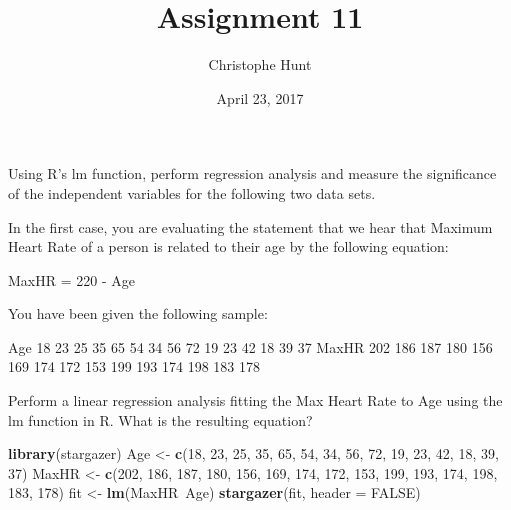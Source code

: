 \documentclass[]{article}
\title{Assignment 11}
\author{Christophe Hunt}
\date{April 23, 2017}
\newenvironment{Shaded}{\begin{snugshade}}{\end{snugshade}}
\newcommand{\KeywordTok}[1]{\textcolor[rgb]{0.13,0.29,0.53}{\textbf{{#1}}}}
\newcommand{\DataTypeTok}[1]{\textcolor[rgb]{0.13,0.29,0.53}{{#1}}}
\newcommand{\DecValTok}[1]{\textcolor[rgb]{0.00,0.00,0.81}{{#1}}}
\newcommand{\StringTok}[1]{\textcolor[rgb]{0.31,0.60,0.02}{{#1}}}
\newcommand{\OtherTok}[1]{\textcolor[rgb]{0.56,0.35,0.01}{{#1}}}
\newcommand{\NormalTok}[1]{{#1}}
\begin{document}
\maketitle

{
\setcounter{tocdepth}{2}
\tableofcontents
}
Using R's lm function, perform regression analysis and measure the
significance of the independent variables for the following two data
sets.

In the first case, you are evaluating the statement that we hear that
Maximum Heart Rate of a person is related to their age by the following
equation:

MaxHR = 220 - Age

You have been given the following sample:

Age 18 23 25 35 65 54 34 56 72 19 23 42 18 39 37 MaxHR 202 186 187 180
156 169 174 172 153 199 193 174 198 183 178

Perform a linear regression analysis fitting the Max Heart Rate to Age
using the lm function in R. What is the resulting equation?

\begin{Shaded}
\begin{Highlighting}[]
\KeywordTok{library}\NormalTok{(stargazer)}
\NormalTok{Age <-}\StringTok{ }\KeywordTok{c}\NormalTok{(}\DecValTok{18}\NormalTok{, }\DecValTok{23}\NormalTok{, }\DecValTok{25}\NormalTok{, }\DecValTok{35}\NormalTok{, }\DecValTok{65}\NormalTok{, }\DecValTok{54}\NormalTok{, }\DecValTok{34}\NormalTok{, }\DecValTok{56}\NormalTok{, }\DecValTok{72}\NormalTok{, }\DecValTok{19}\NormalTok{, }\DecValTok{23}\NormalTok{, }\DecValTok{42}\NormalTok{, }\DecValTok{18}\NormalTok{, }\DecValTok{39}\NormalTok{, }\DecValTok{37}\NormalTok{)}
\NormalTok{MaxHR <-}\StringTok{ }\KeywordTok{c}\NormalTok{(}\DecValTok{202}\NormalTok{, }\DecValTok{186}\NormalTok{, }\DecValTok{187}\NormalTok{, }\DecValTok{180}\NormalTok{, }\DecValTok{156}\NormalTok{, }\DecValTok{169}\NormalTok{, }\DecValTok{174}\NormalTok{, }\DecValTok{172}\NormalTok{, }\DecValTok{153}\NormalTok{, }\DecValTok{199}\NormalTok{, }\DecValTok{193}\NormalTok{, }\DecValTok{174}\NormalTok{, }\DecValTok{198}\NormalTok{, }\DecValTok{183}\NormalTok{, }\DecValTok{178}\NormalTok{)}
\NormalTok{fit <-}\StringTok{ }\KeywordTok{lm}\NormalTok{(MaxHR~Age)}
\KeywordTok{stargazer}\NormalTok{(fit, }\DataTypeTok{header =} \OtherTok{FALSE}\NormalTok{)}
\end{Highlighting}
\end{Shaded}
\end{document}

